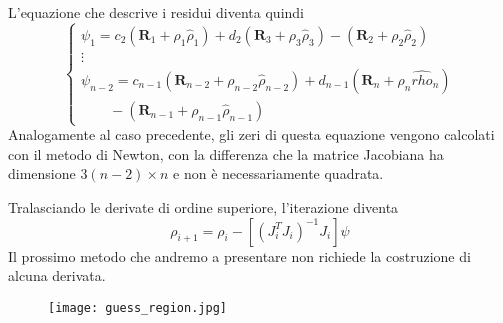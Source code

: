 \documentclass{beamer}
\begin{document}
\begin{frame}[plain]
L'equazione che descrive i residui diventa quindi 
\begin{equation}
\begin{cases}
\psi_1=c_2(\textbf{R}_1+\rho_1 \hat{\rho}_1) + d_2(\textbf{R}_3+\rho_3 \hat{\rho}_3)-(\textbf{R}_2+\rho_2 \hat{\rho}_2) \\
\vdots \\
\psi_{n-2}= c_{n-1} (\textbf{R}_{n-2}+\rho_{n-2} \hat{\rho}_{n-2}) + d_{n-1}(\textbf{R}_n+\rho_n \hat{rho}_n) \\ 
  \qquad - (\textbf{R}_{n-1}+\rho_{n-1} \hat{\rho}_{n-1})
\end{cases}
\end{equation}
Analogamente al caso precedente, gli zeri di questa equazione vengono calcolati con il metodo di Newton, con la differenza che la matrice Jacobiana ha dimensione $3(n-2) \times n$ e non \`e necessariamente quadrata. 
\end{frame}

\begin{frame}[plain]
Tralasciando le derivate di ordine superiore, l'iterazione diventa \begin{equation}
\rho_{i+1}=\rho_i - [(J_i^T J_i)^{-1}J_i]\psi
\end{equation}
Il prossimo metodo che andremo a presentare non richiede la costruzione di alcuna derivata.
\end{frame}

\begin{frame}[plain]
\begin{figure}
\centering
\texttt{[image: guess\_region.jpg]}
\end{figure}
\end{frame}
\end{document}

